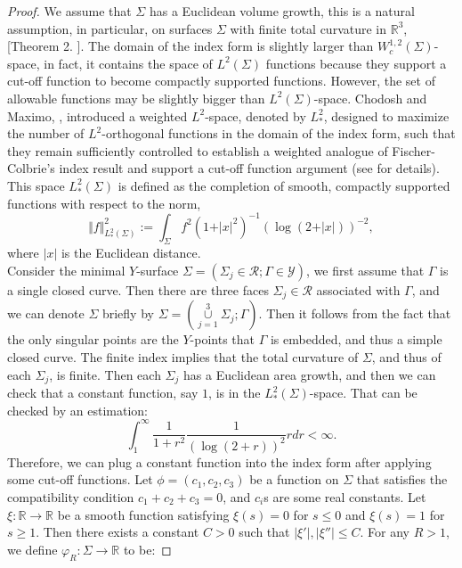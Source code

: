 \documentclass[11pt]{amsart}
\numberwithin{equation}{section}
\theoremstyle{theorem}
\theoremstyle{definition}
\numberwithin{equation}{section}
\begin{document}
\begin{proof}
We assume that $\Sigma$ has a Euclidean volume growth, this is a natural assumption, in particular, on surfaces $\Sigma$ with finite total curvature in $\mathbb{R}^3$,  [Theorem 2. \cite{fischer1985complete}]. The domain of the index form is slightly larger than $W_c^{1,2}(\Sigma)$-space, in fact, it contains the space of $L^2(\Sigma)$ functions because they support a cut-off function to become compactly supported functions. However, the set of allowable functions may be slightly bigger than $L^2(\Sigma)$-space. Chodosh and Maximo, \cite{chodosh2023topology}, introduced a weighted $L^2$-space, denoted by $L_*^2$, designed to maximize the number of $L^2$-orthogonal functions in the domain of the index form, such that they remain sufficiently controlled to establish a weighted analogue of Fischer-Colbrie’s index result \cite{fischer1985complete} and support a cut-off function argument (see \cite{chodosh2023topology} for details). This space $L_*^2(\Sigma)$ is defined as the completion of smooth, compactly supported functions with respect to the norm,
$$
\Vert f\Vert_{L_*^2(\Sigma)}^{2}:=\int_{\Sigma}f^2(1+\vert x\vert^2)^{-1}(\log(2+\vert x\vert))^{-2},
$$
where $\vert x\vert$ is the Euclidean distance. \\
Consider the minimal $Y$-surface $\Sigma =(\Sigma_j\in \mathcal{R}; \Gamma \in \mathcal{Y})$, we first assume that $\Gamma$ is a single closed curve. Then there are three faces $\Sigma_j \in\mathcal{R}$ associated with $\Gamma$, and we can denote $\Sigma$ briefly by $\Sigma =(\underset{j=1}{\overset{3}{\cup }} \Sigma_j; \Gamma )$. Then it follows from the fact that the only singular points are the $Y$-points that $\Gamma$ is embedded, and thus a simple closed curve. The finite index implies that the total curvature of $\Sigma$, and thus of each $\Sigma_j$, is finite. Then each $\Sigma_j$ has a Euclidean area growth, and then we can check that a constant function, say $1$, is in the $L^2_*(\Sigma)$-space. That can be checked by an estimation:
$$
\int_1^{\infty}\frac{1}{1+r^2}\frac{1}{(\log(2+ r))^2}rdr <\infty .
$$
Therefore, we can plug a constant function into the index form after applying some cut-off functions. Let $\phi=(c_1,c_2,c_3)$ be a function on $\Sigma$ that satisfies the compatibility condition $c_1+c_2+c_3=0$, and $c_i$s are some real constants. Let $\xi :\mathbb{R}\to \mathbb{R}$ be a smooth function satisfying $\xi(s)=0$ for $s\leq 0$ and $\xi (s)=1$ for $s\geq 1$. Then there exists a constant $C>0$ such that $\vert \xi'\vert,\vert \xi''\vert\leq C$. For any $R>1$, we define $\varphi_R:\Sigma\to \mathbb{R}$ to be:

\end{proof}
\end{document}
